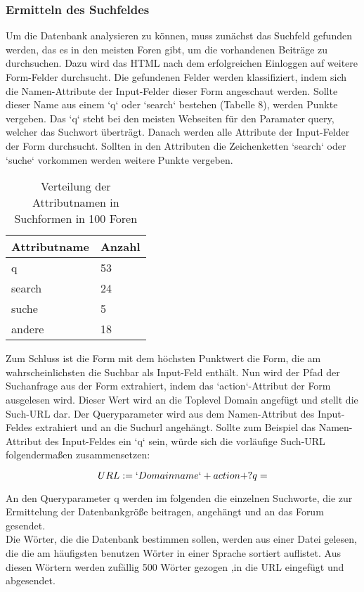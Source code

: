 \subsubsection{Ermitteln des Suchfeldes}
Um die Datenbank analysieren zu können, muss zunächst das Suchfeld gefunden werden, das es in den meisten Foren gibt, um die vorhandenen Beiträge zu durchsuchen.
Dazu wird das HTML nach dem erfolgreichen Einloggen auf weitere Form-Felder durchsucht. Die gefundenen Felder werden klassifiziert, indem sich die Namen-Attribute der Input-Felder dieser Form angeschaut werden. Sollte dieser Name aus einem `q` oder `search` bestehen (Tabelle 8), werden Punkte vergeben. Das `q` steht bei den meisten Webseiten für den Paramater query, welcher das Suchwort überträgt.
Danach werden alle Attribute der Input-Felder der Form durchsucht. Sollten in den Attributen die Zeichenketten `search` oder `suche` vorkommen werden weitere Punkte vergeben.

\begin{table}[h!]
\centering 
\begin{tabular}{ | p{3cm} | p{3cm}|} \hline
Attributname & Anzahl \\ \hline
q & 53 \\ \hline
search & 24 \\ \hline
suche & 5 \\ \hline
andere & 18 \\ \hline
\end{tabular}
\caption{Verteilung der Attributnamen in Suchformen in 100 Foren}
\end{table}

Zum Schluss ist die Form mit dem höchsten Punktwert die Form, die am wahrscheinlichsten die Suchbar als Input-Feld enthält.
Nun wird der Pfad der Suchanfrage aus der Form extrahiert, indem das `action`-Attribut der Form ausgelesen wird. Dieser Wert wird an die Toplevel Domain angefügt und stellt die Such-URL dar. Der Queryparameter wird aus dem Namen-Attribut des Input-Feldes extrahiert und an die Suchurl angehängt. Sollte zum Beispiel das Namen-Attribut des Input-Feldes ein `q` sein, würde sich die vorläufige Such-URL folgendermaßen zusammensetzen:

\[ URL := `Domainname` + action + ?q= \]

An den Queryparameter q werden im folgenden die einzelnen Suchworte, die zur Ermittelung der Datenbankgröße beitragen, angehängt und an das Forum gesendet.\\
Die Wörter, die die Datenbank bestimmen sollen, werden aus einer Datei gelesen, die die am häufigsten benutzen Wörter in einer Sprache sortiert auflistet. Aus diesen Wörtern werden zufällig 500 Wörter gezogen ,in die URL eingefügt und abgesendet.

